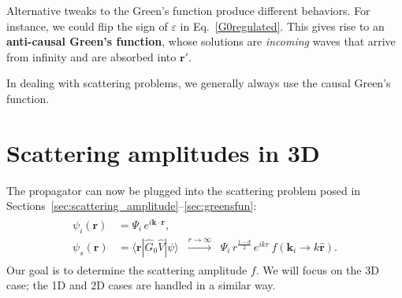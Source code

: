 \documentclass[pra,12pt]{revtex4}
\begin{document}
Alternative tweaks to the Green's function produce different
behaviors.  For instance, we could flip the sign of $\varepsilon$ in
Eq.~\eqref{G0regulated}.  This gives rise to an \textbf{anti-causal
  Green's function}, whose solutions are \textit{incoming} waves that
arrive from infinity and are absorbed into $\mathbf{r}'$.

In dealing with scattering problems, we generally always use the
causal Green's function.

\section{Scattering amplitudes in 3D}
\label{sec:3damp}

The propagator can now be plugged into the scattering problem
posed in Sections~\ref{sec:scattering_amplitude}--\ref{sec:greensfun}:
\begin{align}
  \begin{aligned} \psi_i(\mathbf{r}) &= \Psi_i \, e^{i\mathbf{k}\cdot\mathbf{r}}, \\ \psi_s(\mathbf{r}) &= \langle\mathbf{r}| \hat{G}_0 \hat{V} |\psi\rangle \;\; \overset{r\rightarrow\infty}{\longrightarrow}\;\; \Psi_i \, r^{\frac{1-d}{2}} \, e^{ikr} \, f(\mathbf{k}_i\rightarrow k\hat{\mathbf{r}}).
  \end{aligned}
\end{align}
Our goal is to determine the scattering amplitude $f$.  We will focus
on the 3D case; the 1D and 2D cases are handled in a similar way.
\end{document}
